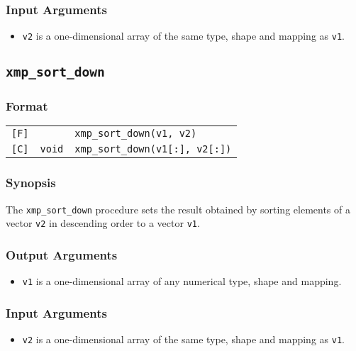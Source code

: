 \subsubsection*{Input Arguments}
\begin{itemize}
 \item {\tt v2} is a one-dimensional array of the same type, shape and
       mapping as {\tt v1}.
\end{itemize}


\subsection{\tt xmp\_sort\_down}

\subsubsection*{Format}

\begin{tabular}{lll}

\verb![F]!&            & {\tt xmp\_sort\_down(v1, v2)}\\

\verb![C]!& {\tt void} & {\tt xmp\_sort\_down(v1[:], v2[:])}\\

\end{tabular}

\subsubsection*{Synopsis}

The {\tt xmp\_sort\_down} procedure sets the result obtained by
sorting elements of a vector {\tt v2} in descending order to a vector
{\tt v1}.

\subsubsection*{Output Arguments}
\begin{itemize}
 \item {\tt v1} is a one-dimensional array of any numerical type,
       shape and mapping.
\end{itemize}

\subsubsection*{Input Arguments}
\begin{itemize}
 \item {\tt v2} is a one-dimensional array of the same type, shape and
       mapping as {\tt v1}.
\end{itemize}

